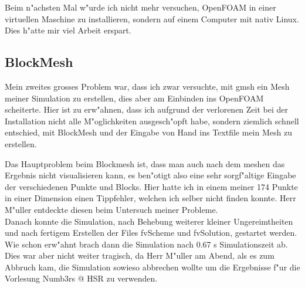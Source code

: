 \begin{refsection}
Beim n"achsten Mal w"urde ich nicht mehr versuchen, OpenFOAM in einer
virtuellen Maschine zu installieren, sondern auf einem Computer mit
nativ Linux. Dies h"atte mir viel Arbeit erspart.

\subsection{BlockMesh}
Mein zweites grosses Problem war, dass ich zwar versuchte, mit gmsh ein
Mesh meiner Simulation zu erstellen, dies aber am Einbinden ins OpenFOAM
scheiterte. Hier ist zu erw"ahnen, dass ich aufgrund der verlorenen
Zeit bei der Installation nicht alle M"oglichkeiten ausgesch"opft habe,
sondern ziemlich schnell entschied, mit BlockMesh und der Eingabe von
Hand ins Textfile mein Mesh zu erstellen.

Das Hauptproblem beim Blockmesh ist, dass man auch nach dem meshen
das Ergebnis nicht visualisieren kann, es ben"otigt also eine sehr
sorgf"altige Eingabe der verschiedenen Punkte und Blocks. Hier hatte
ich in einem meiner 174 Punkte in einer Dimension einen Tippfehler,
welchen ich selber nicht finden konnte. Herr M"uller entdeckte diesen
beim Untersuch meiner Probleme. \\ Danach konnte die Simulation, nach
Behebung weiterer kleiner Ungereimtheiten und nach fertigem Erstellen der
Files fvScheme und fvSolution, gestartet werden. Wie schon erw"ahnt brach
dann die Simulation nach 0.67 s Simulationszeit ab. Dies war aber nicht
weiter tragisch, da Herr M"uller am Abend, als es zum Abbruch kam, die
Simulation sowieso abbrechen wollte um die Ergebnisse f"ur die Vorlesung
Numb3rs @ HSR zu verwenden.


\end{refsection}
